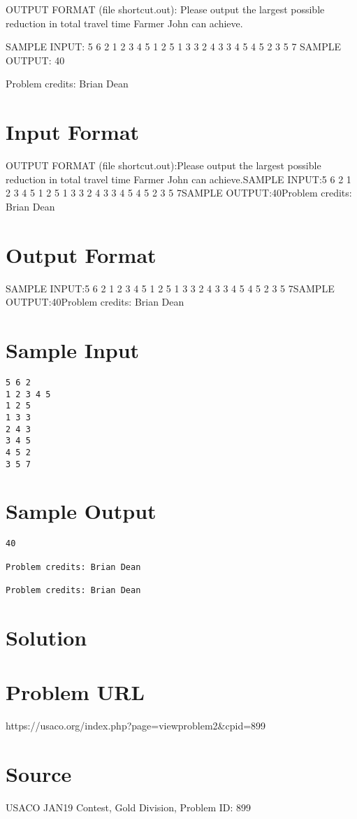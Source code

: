 \documentclass[12pt]{article}
\begin{document}
OUTPUT FORMAT (file shortcut.out):
Please output the largest possible reduction in total travel time Farmer John
can achieve.  

SAMPLE INPUT:
5 6 2
1 2 3 4 5
1 2 5
1 3 3
2 4 3
3 4 5
4 5 2
3 5 7
SAMPLE OUTPUT: 
40


Problem credits: Brian Dean



\section*{Input Format}
OUTPUT FORMAT (file shortcut.out):Please output the largest possible reduction in total travel time Farmer John
can achieve.SAMPLE INPUT:5 6 2
1 2 3 4 5
1 2 5
1 3 3
2 4 3
3 4 5
4 5 2
3 5 7SAMPLE OUTPUT:40Problem credits: Brian Dean

\section*{Output Format}
SAMPLE INPUT:5 6 2
1 2 3 4 5
1 2 5
1 3 3
2 4 3
3 4 5
4 5 2
3 5 7SAMPLE OUTPUT:40Problem credits: Brian Dean

\section*{Sample Input}
\begin{verbatim}
5 6 2
1 2 3 4 5
1 2 5
1 3 3
2 4 3
3 4 5
4 5 2
3 5 7
\end{verbatim}

\section*{Sample Output}
\begin{verbatim}
40

Problem credits: Brian Dean

Problem credits: Brian Dean
\end{verbatim}

\section*{Solution}


\section*{Problem URL}
https://usaco.org/index.php?page=viewproblem2&cpid=899

\section*{Source}
USACO JAN19 Contest, Gold Division, Problem ID: 899
\end{document}
